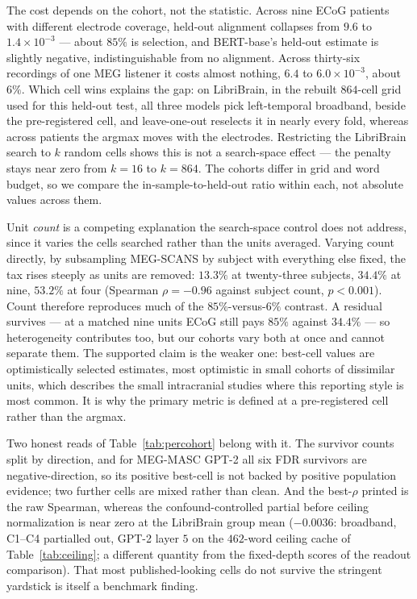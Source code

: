 \documentclass{article}
\begin{document}
The cost depends on the cohort, not the statistic. Across nine ECoG patients with different
electrode coverage, held-out alignment collapses from $9.6$ to $1.4\times10^{-3}$ --- about $85\%$
is selection, and BERT-base's held-out estimate is slightly negative, indistinguishable from no
alignment. Across thirty-six recordings of one MEG listener it costs almost nothing, $6.4$ to
$6.0\times10^{-3}$, about $6\%$. Which cell wins explains the gap: on LibriBrain, in the rebuilt
$864$-cell grid used for this held-out test, all three models pick left-temporal broadband, beside the pre-registered cell, and leave-one-out reselects it in
nearly every fold, whereas across patients the argmax moves with the electrodes. Restricting the
LibriBrain search to $k$ random cells shows this is not a search-space effect --- the penalty stays
near zero from $k=16$ to $k=864$. The cohorts differ in grid and word budget, so we compare the
in-sample-to-held-out ratio within each, not absolute values across them.

Unit \emph{count} is a competing explanation the search-space control does not address, since it
varies the cells searched rather than the units averaged. Varying count directly, by subsampling
MEG-SCANS by subject with everything else fixed, the tax rises steeply as units are removed:
$13.3\%$ at twenty-three subjects, $34.4\%$ at nine, $53.2\%$ at four (Spearman $\rho = -0.96$
against subject count, $p < 0.001$). Count therefore reproduces much of the $85\%$-versus-$6\%$
contrast. A residual survives --- at a matched nine units ECoG still pays $85\%$ against $34.4\%$ ---
so heterogeneity contributes too, but our cohorts vary both at once and cannot separate them. The
supported claim is the weaker one: best-cell values are optimistically selected estimates, most optimistic in small cohorts of
dissimilar units, which describes the small intracranial studies where this reporting style is most
common. It is why the primary metric is defined at a pre-registered cell rather than the argmax.

Two honest reads of Table~\ref{tab:percohort} belong with it. The survivor counts split by
direction, and for MEG-MASC GPT-2 all six FDR survivors are negative-direction, so its positive
best-cell is not backed by positive population evidence; two further cells are mixed rather than
clean. And the best-$\rho$ printed is the raw Spearman, whereas the confound-controlled partial
before ceiling normalization is near zero at the LibriBrain group
mean ($-0.0036$: broadband, C1--C4 partialled out, GPT-2 layer $5$ on the $462$-word ceiling cache of
Table~\ref{tab:ceiling}; a different quantity from the fixed-depth scores of the readout comparison). That most published-looking cells do not survive the stringent yardstick is itself
a benchmark finding.
\end{document}
